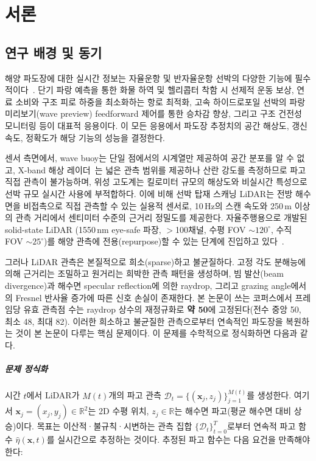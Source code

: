 \documentclass[11pt]{report}
\numberwithin{equation}{chapter}
\numberwithin{figure}{chapter}
\numberwithin{table}{chapter}
\begin{document}
\chapter{서론}
\label{chap:intro}

\section{연구 배경 및 동기}
\label{sec:motivation}

해양 파도장에 대한 실시간 정보는 자율운항 및 반자율운항 선박의 다양한 기능에
필수적이다~\citep{Faltinsen2005}.
단기 파랑 예측을 통한 화물 하역 및 헬리콥터 착함 시 선제적 운동 보상,
연료 소비와 구조 피로 하중을 최소화하는 항로 최적화,
고속 하이드로포일 선박의 파랑 미리보기(wave preview) feedforward 제어를
통한 승차감 향상, 그리고 구조 건전성 모니터링 등이 대표적 응용이다.
이 모든 응용에서 파도장 추정치의 공간 해상도, 갱신 속도, 정확도가
해당 기능의 성능을 결정한다.

센서 측면에서, wave buoy는 단일 점에서의 시계열만 제공하여 공간 분포를 알 수 없고,
X-band 해상 레이더~\citep{nieto2004}는 넓은 관측 범위를 제공하나 산란 강도를
측정하므로 파고 직접 관측이 불가능하며, 위성 고도계는 킬로미터 규모의 해상도와
비실시간 특성으로 선박 규모 실시간 사용에 부적합하다.
이에 비해 선박 탑재 스캐닝 LiDAR는 전방 해수면을 비접촉으로 직접 관측할 수 있는
실용적 센서로, 10\,Hz의 스캔 속도와 250\,m 이상의 관측 거리에서
센티미터 수준의 근거리 정밀도를 제공한다.
자율주행용으로 개발된 solid-state LiDAR (1550\,nm eye-safe 파장,
$>$100채널, 수평 FOV $\sim$$120^\circ$, 수직 FOV $\sim$$25^\circ$)를
해양 관측에 전용(repurpose)할 수 있는 단계에
진입하고 있다~\citep{hwang2000, Belmont2008}.

그러나 LiDAR 관측은 본질적으로 희소(sparse)하고 불균질하다.
고정 각도 분해능에 의해 근거리는 조밀하고 원거리는 희박한 관측 패턴을 생성하며,
빔 발산(beam divergence)과 해수면 specular reflection에 의한 raydrop,
그리고 grazing angle에서의 Fresnel 반사율 증가에 따른 신호 손실이 존재한다.
본 논문이 쓰는 코퍼스에서 프레임당 유효 관측점 수는 raydrop 상수의 재정규화로
\textbf{약 50}에 고정된다(전수 중앙 50, 최소 48, 최대 82).
이러한 희소하고 불균질한 관측으로부터 연속적인 파도장을
복원하는 것이 본 논문이 다루는 핵심 문제이다.
이 문제를 수학적으로 정식화하면 다음과 같다.

\paragraph{문제 정식화}
시간 $t$에서 LiDAR가 $M(t)$개의 파고 관측
$\mathcal{D}_t = \{(\mathbf{x}_j, z_j)\}_{j=1}^{M(t)}$를 생성한다.
여기서 $\mathbf{x}_j = (x_j, y_j) \in \mathbb{R}^2$는 2D 수평 위치,
$z_j \in \mathbb{R}$는 해수면 파고(평균 해수면 대비 상승)이다.
목표는 이산적·불규칙·시변하는 관측 집합 $\{\mathcal{D}_t\}_{t=0}^{T}$로부터
연속적 파고 함수 $\hat{\eta}(\mathbf{x}, t)$를 실시간으로 추정하는 것이다.
추정된 파고 함수는 다음 요건을 만족해야 한다:
\end{document}
